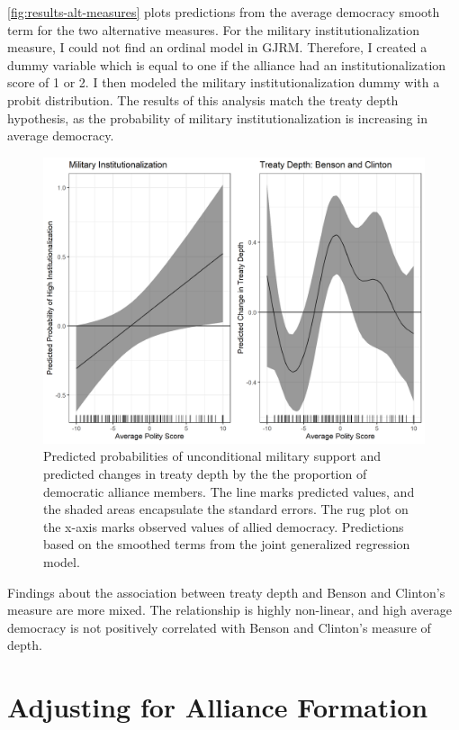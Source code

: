 \documentclass[12pt]{article}
\begin{document}
\autoref{fig:results-alt-measures} plots predictions from the average democracy smooth term for the two alternative measures. 
For the military institutionalization measure, I could not find an ordinal model in GJRM. 
Therefore, I created a dummy variable which is equal to one if the alliance had an institutionalization score of 1 or 2. 
I then modeled the military institutionalization dummy with a probit distribution. 
The results of this analysis match the treaty depth hypothesis, as the probability of military institutionalization is increasing in average democracy. 


\begin{figure}
\includegraphics[width=.95\textwidth]{results-alt-measures.png}  
\caption{Predicted probabilities of unconditional military support and predicted changes in treaty depth by the the proportion of democratic alliance members. The line marks predicted values, and the shaded areas encapsulate the standard errors. The rug plot on the x-axis marks observed values of allied democracy. Predictions based on the smoothed terms from the joint generalized regression model.}
\label{fig:results-alt-measures}
\end{figure}

Findings about the association between treaty depth and Benson and Clinton's measure are more mixed. 
The relationship is highly non-linear, and high average democracy is not positively correlated with Benson and Clinton's measure of depth. 



\section{Adjusting for Alliance Formation}
\end{document}
